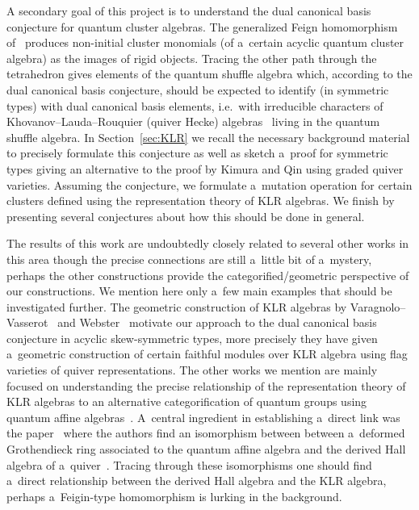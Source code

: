\documentclass[pdftex]{sigma}
\numberwithin{equation}{section}
\begin{document}
A secondary goal of this project is to understand the dual canonical basis conjecture for quantum cluster algebras.
The generalized Feign homomorphism of~\cite{berenstein-rupel} produces non-initial cluster monomials (of a~certain
acyclic quantum cluster algebra) as the images of rigid objects.
Tracing the other path through the tetrahedron gives elements of the quantum shuf\/f\/le algebra which, according to the
dual canonical basis conjecture, should be expected to identify (in symmetric types) with dual canonical basis elements,
i.e.~with irreducible characters of Khovanov--Lauda--Rouquier (quiver Hecke)
algebras~\cite{khovanov-lauda1,khovanov-lauda2,rouquier1,rouquier2} living in the quantum shuf\/f\/le algebra.
In Section~\ref{sec:KLR} we recall the necessary background material to precisely formulate this conjecture as well as
sketch a~proof for symmetric types giving an alternative to the proof by Kimura and Qin using graded quiver varieties.
Assuming the conjecture, we formulate a~mutation operation for certain clusters def\/ined using the representation theory
of KLR algebras.
We f\/inish by presenting several conjectures about how this should be done in general.

The results of this work are undoubtedly closely related to several other works in this area though the precise
connections are still a~little bit of a~mystery, perhaps the other constructions provide the categorif\/ied/geometric
perspective of our constructions.
We mention here only a~few main examples that should be investigated further.
The geometric construction of KLR algebras by Varagnolo--Vasserot~\cite{varagnolo-vasserot} and Webster~\cite{webster}
motivate our approach to the dual canonical basis conjecture in acyclic skew-symmetric types, more precisely they have
given a~geometric construction of certain faithful modules over KLR algebra using f\/lag varieties of quiver
representations.
The other works we mention are mainly focused on understanding the precise relationship of the representation theory of
KLR algebras to an alternative categorif\/ication of quantum groups using quantum af\/f\/ine
algebras~\cite{kang-kashiwara-kim}.
A~central ingredient in establishing a~direct link was the paper~\cite{hernandez-leclerc2} where the authors f\/ind an  %
isomorphism between between a~deformed Grothendieck ring associated to the quantum af\/f\/ine algebra and the derived Hall
algebra of a~quiver~\cite{toen}.
Tracing through these isomorphisms one should f\/ind a~direct relationship between the derived Hall algebra and the KLR
algebra, perhaps a~Feigin-type homomorphism is lurking in the background.
\end{document}
